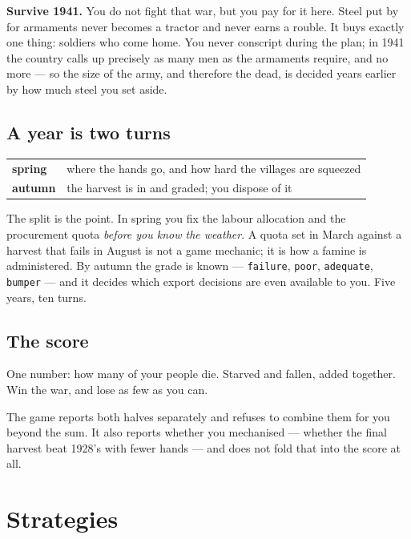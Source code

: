 \documentclass[11pt,a4paper]{article}
\begin{document}
\textbf{Survive 1941.} You do not fight that war, but you pay for it here.
Steel put by for armaments never becomes a tractor and never earns a rouble. It
buys exactly one thing: soldiers who come home. You never conscript during the
plan; in 1941 the country calls up precisely as many men as the armaments
require, and no more --- so the size of the army, and therefore the dead, is
decided years earlier by how much steel you set aside.

\subsection{A year is two turns}

\begin{center}
\begin{tabular}{@{}ll@{}}
\toprule
\textbf{spring} & where the hands go, and how hard the villages are squeezed \\
\textbf{autumn} & the harvest is in and graded; you dispose of it \\
\bottomrule
\end{tabular}
\end{center}

\noindent The split is the point. In spring you fix the labour allocation and
the procurement quota \emph{before you know the weather}. A quota set in March
against a harvest that fails in August is not a game mechanic; it is how a
famine is administered. By autumn the grade is known --- \texttt{failure},
\texttt{poor}, \texttt{adequate}, \texttt{bumper} --- and it decides which
export decisions are even available to you. Five years, ten turns.

\subsection{The score}

One number: how many of your people die. Starved and fallen, added together.
Win the war, and lose as few as you can.

The game reports both halves separately and refuses to combine them for you
beyond the sum. It also reports whether you mechanised --- whether the final
harvest beat 1928's with fewer hands --- and does not fold that into the score
at all.

\section{Strategies}
\end{document}
